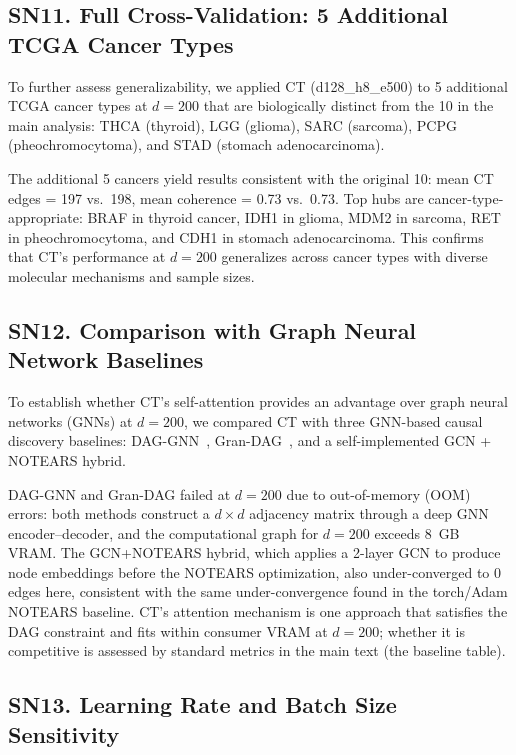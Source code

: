 \documentclass[12pt,a4paper]{article}
\begin{document}
\subsection*{SN11. Full Cross-Validation: 5 Additional TCGA Cancer Types}

To further assess generalizability, we applied CT (d128\_h8\_e500) to 5 additional TCGA cancer types at $d=200$ that are biologically distinct from the 10 in the main analysis: THCA (thyroid), LGG (glioma), SARC (sarcoma), PCPG (pheochromocytoma), and STAD (stomach adenocarcinoma).

The additional 5 cancers yield results consistent with the original 10: mean CT edges = 197 vs.\ 198, mean coherence = 0.73 vs.\ 0.73. Top hubs are cancer-type-appropriate: BRAF in thyroid cancer, IDH1 in glioma, MDM2 in sarcoma, RET in pheochromocytoma, and CDH1 in stomach adenocarcinoma. This confirms that CT's performance at $d=200$ generalizes across cancer types with diverse molecular mechanisms and sample sizes.

\subsection*{SN12. Comparison with Graph Neural Network Baselines}

To establish whether CT's self-attention provides an advantage over graph neural networks (GNNs) at $d=200$, we compared CT with three GNN-based causal discovery baselines: DAG-GNN~\cite{yu2019daggnn}, Gran-DAG~\cite{lachapelle2020gradient}, and a self-implemented GCN + NOTEARS hybrid.

DAG-GNN and Gran-DAG failed at $d=200$ due to out-of-memory (OOM) errors: both methods construct a $d \times d$ adjacency matrix through a deep GNN encoder--decoder, and the computational graph for $d=200$ exceeds 8~GB VRAM. The GCN+NOTEARS hybrid, which applies a 2-layer GCN to produce node embeddings before the NOTEARS optimization, also under-converged to 0 edges here, consistent with the same under-convergence found in the torch/Adam NOTEARS baseline. CT's attention mechanism is one approach that satisfies the DAG constraint and fits within consumer VRAM at $d=200$; whether it is competitive is assessed by standard metrics in the main text (the baseline table).

\subsection*{SN13. Learning Rate and Batch Size Sensitivity}
\end{document}
